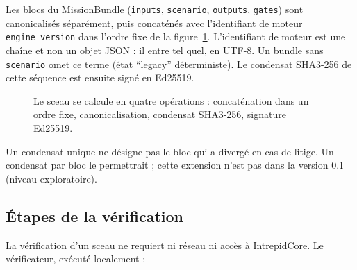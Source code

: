 \documentclass[11pt,a4paper]{article}
\begin{document}
Les blocs du MissionBundle (\texttt{inputs}, \texttt{scenario}, \texttt{outputs}, \texttt{gates}) sont canonicalisés séparément, puis concaténés avec l'identifiant de moteur \texttt{engine\_version} dans l'ordre fixe de la figure~\ref{fig:digest}. L'identifiant de moteur est une chaîne et non un objet JSON : il entre tel quel, en UTF-8. Un bundle sans \texttt{scenario} omet ce terme (état \enquote{legacy} déterministe). Le condensat SHA3-256 de cette séquence est ensuite signé en Ed25519.

\begin{figure}[H]\centering
{}
\caption{Le sceau se calcule en quatre opérations : concaténation dans un ordre fixe, canonicalisation, condensat SHA3-256, signature Ed25519.}\label{fig:digest}
\end{figure}

Un condensat unique ne désigne pas le bloc qui a divergé en cas de litige. Un condensat par bloc le permettrait ; cette extension n'est pas dans la version 0.1 (niveau exploratoire).

\subsection{Étapes de la vérification}\label{sec:verif}

La vérification d'un sceau ne requiert ni réseau ni accès à IntrepidCore. Le vérificateur, exécuté localement :
\end{document}
